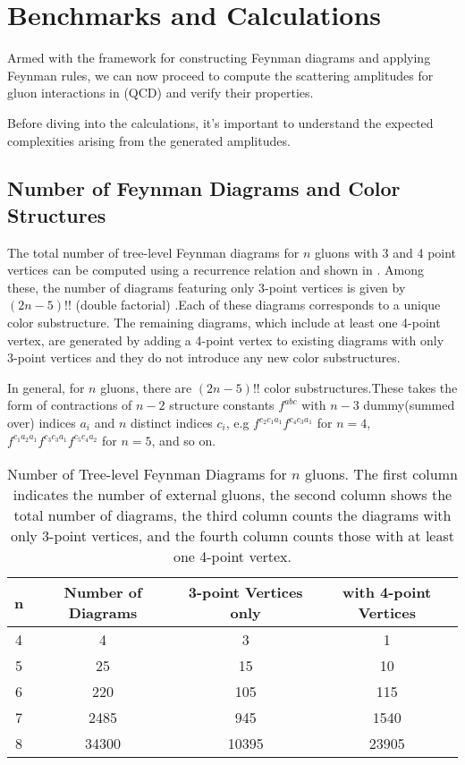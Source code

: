 \documentclass[main.tex]{subfiles}
\begin{document}
\section{Benchmarks and Calculations}

Armed with the framework for constructing Feynman diagrams and applying Feynman rules, we can now proceed to compute the 
scattering amplitudes for gluon interactions in (QCD) and verify their properties. 

Before diving into the calculations, it's important to understand the expected complexities arising from the generated amplitudes.

\subsection{Number of Feynman Diagrams and Color Structures}

The total number of tree-level Feynman diagrams for $n$ gluons with 3 and 4 point vertices can be computed using a recurrence relation\cite{OEIS:A268163} and shown in .
Among these, the number of diagrams featuring only 3-point vertices is given by $(2n-5)!!$ (double factorial) \cite{OEIS:A001147}.Each of these diagrams corresponds to a unique color substructure. 
The remaining diagrams, which include at least one 4-point vertex, are generated by adding a 4-point vertex to existing diagrams with only 3-point vertices and 
they do not introduce any new color substructures.

In general, for $n$ gluons, there are $(2n-5)!!$ color substructures.These takes the form of contractions of $n-2$ structure constants $f^{abc}$ with $n-3$ dummy(summed over) indices $a_i$ and $n$ distinct
indices $c_i$, e.g $f^{c_2 c_1 a_1}f^{c_4 c_3 a_1}$ for $n=4$, $f^{c_1 a_2 a_1} f^{c_3 c_3 a_1} f^{c_5 c_4 a_2}$ for $n=5$, and so on. 

\begin{table}[htbp]\centering
\caption{Number of Tree-level Feynman Diagrams for $n$ gluons. The first column indicates the number of external gluons,
the second column shows the total number of diagrams, the third column counts the diagrams with only 3-point vertices, and the fourth column counts those with at least one 4-point vertex.}
\label{tab:tree-diagrams}

    \begin{tabular}{|c|c|c|c|}
        \hline
        \textbf{n} & \textbf{Number of Diagrams} & \textbf{3-point Vertices only} & \textbf{with 4-point Vertices} \\
        \hline
        4 & 4 & 3 & 1 \\
        5 & 25 & 15 & 10 \\
        6 & 220 & 105 & 115 \\
        7 & 2485 & 945 & 1540 \\
        8 & 34300 & 10395 & 23905 \\
        \hline    
    \end{tabular}
\end{table}
\end{document}

